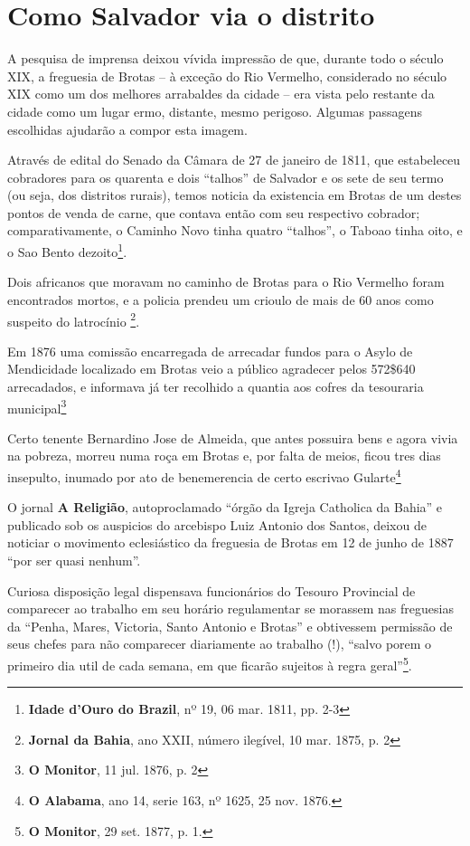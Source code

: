 \section{Como Salvador via o distrito}\label{sec:2.5}

A pesquisa de imprensa deixou vívida impressão de que, durante todo o século XIX, a freguesia de Brotas -- à exceção do Rio Vermelho, considerado no século XIX como um dos melhores arrabaldes da cidade -- era vista pelo restante da cidade como um lugar ermo, distante, mesmo perigoso. Algumas passagens escolhidas ajudarão a compor esta imagem.

Através de edital do Senado da Câmara de 27 de janeiro de 1811, que estabeleceu cobradores para os quarenta e dois ``talhos'' de Salvador e os sete de seu termo (ou seja, dos distritos rurais), temos noticia da existencia em Brotas de um destes pontos de venda de carne, que contava então com seu respectivo cobrador; comparativamente, o Caminho Novo tinha quatro ``talhos'', o Taboao tinha oito, e o Sao Bento dezoito\footnote{\textbf{Idade d'Ouro do Brazil}, nº 19, 06 mar. 1811, pp. 2-3}.

Dois africanos que moravam no caminho de Brotas para o Rio Vermelho foram encontrados mortos, e a policia prendeu um crioulo de mais de 60 anos como suspeito do latrocínio \footnote{\textbf{Jornal da Bahia}, ano XXII, número ilegível, 10 mar. 1875, p. 2}.

Em 1876 uma comissão encarregada de arrecadar fundos para o Asylo de Mendicidade localizado em Brotas veio a público agradecer pelos 572\$640 arrecadados, e informava já ter recolhido a quantia aos cofres da tesouraria municipal\footnote{\textbf{O Monitor}, 11 jul. 1876, p. 2}

Certo tenente Bernardino Jose de Almeida, que antes possuira bens e agora vivia na pobreza, morreu numa roça em Brotas e, por falta de meios, ficou tres dias insepulto, inumado por ato de benemerencia de certo escrivao Gularte\footnote{\textbf{O Alabama}, ano 14, serie 163, nº 1625, 25 nov. 1876.}

O jornal \textbf{A Religião}, autoproclamado ``órgão da Igreja Catholica da Bahia'' e publicado sob os auspicios do arcebispo Luiz Antonio dos Santos, deixou de noticiar o movimento eclesiástico da freguesia de Brotas em 12 de junho de 1887 ``por ser quasi nenhum''.

Curiosa disposição legal dispensava funcionários do Tesouro Provincial de comparecer ao trabalho em seu horário regulamentar se morassem nas freguesias da ``Penha, Mares, Victoria, Santo Antonio e Brotas'' e obtivessem permissão de seus chefes para não comparecer diariamente ao trabalho (!), ``salvo porem o primeiro dia util de cada semana, em que ficarão sujeitos à regra geral''\footnote{\textbf{O Monitor}, 29 set. 1877, p. 1.}.

